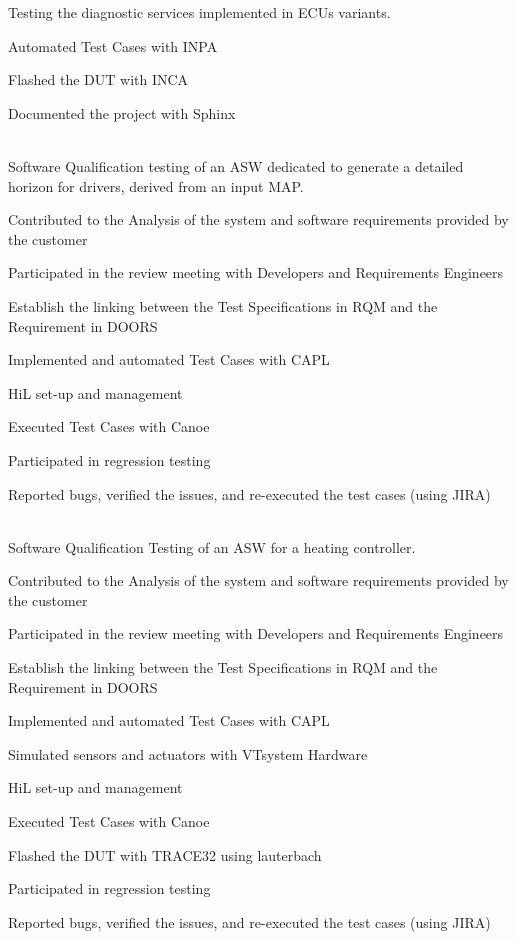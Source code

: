 \documentclass{my_cv}
\begin{document}
{}{Testing the diagnostic services implemented in ECUs variants.}{
    \item Automated Test Cases with INPA 
    \item Flashed the DUT with INCA
    \item Documented the project with Sphinx
}\vspace{0.1cm}
\\
{ }{Software Qualification testing of an ASW dedicated to generate a detailed 
horizon for drivers, derived from an input MAP.}{
    \item  Contributed to the Analysis of the system and software requirements provided by the customer
    \item  Participated in the review meeting with Developers and Requirements Engineers
    \item  Establish the linking between the Test Specifications in RQM and the Requirement in DOORS
    \item Implemented and automated Test Cases with CAPL
    \item HiL set-up and management 
    \item Executed Test Cases with Canoe 
    \item Participated in regression testing
   \item Reported bugs, verified the issues, and re-executed the test cases (using JIRA)
}\vspace{0.1cm}
\\
{ }{Software Qualification Testing of an ASW for a heating controller.}{
    \item  Contributed to the Analysis of the system and software requirements provided by the customer
    \item  Participated in the review meeting with Developers and Requirements Engineers
    \item  Establish the linking between the Test Specifications in RQM and the Requirement in DOORS
    \item Implemented and automated Test Cases with CAPL
    \item Simulated sensors and actuators with VTsystem Hardware
    \item HiL set-up and management 
    \item Executed Test Cases with Canoe 
     \item Flashed the DUT with TRACE32 using lauterbach
    \item Participated in regression testing
   \item Reported bugs, verified the issues, and re-executed the test cases (using JIRA)

}\vspace{0.1cm}
\end{document}
